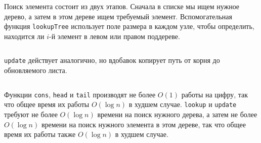 \begin{frame}[fragile]{}

Поиск элемента
состоит из двух этапов. Сначала в списке мы ищем нужное дерево, а
затем в этом дереве ищем требуемый элемент. Вспомогательная функция
\lstinline!lookupTree! использует поле размера в каждом узле, чтобы
определить, находится ли $i$-й элемент в левом или правом
поддереве.
\inputminted[firstline=34,lastline=44,gobble=2]{haskell}{code/BinaryRandomAccessList.lhs}
\end{frame}

\begin{frame}[fragile]{}
\lstinline!update! действует аналогично, но вдобавок копирует путь от
корня до обновляемого листа.
\inputminted[firstline=48,lastline=60,gobble=2]{haskell}{code/BinaryRandomAccessList.lhs}


%
\end{frame}

\begin{frame}[fragile]{}

Функции \lstinline!cons!, \lstinline!head! и \lstinline!tail!
производят не более $O(1)$ работы на цифру, так что общее время их
работы $O(\log n)$ в худшем случае. \lstinline!lookup! и
\lstinline!update! требуют не более $O(\log n)$ времени на поиск
нужного дерева, а затем не более $O(\log n)$ времени на поиск нужного
элемента в этом дереве, так что общее время их работы также $O(\log
n)$ в худшем случае.

\end{frame}

